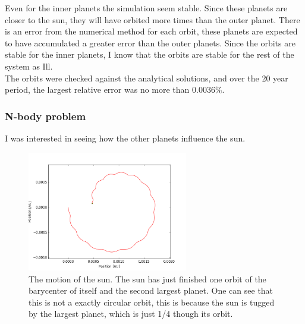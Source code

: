 \documentclass[a4paper, 10pt]{article}
\begin{document}
Even for the inner planets the simulation seem stable. Since these planets are closer to the sun, they will have orbited more times than the outer planet. There is an error from the numerical method for each orbit, these planets are expected to have accumulated a greater error than the outer planets. Since the orbits are stable for the inner planets, I know that the orbits are stable for the rest of the system as Ill.\\

The orbits were checked against the analytical solutions, and over the 20 year period, the largest relative error was no more than $0.0036\%$.


\subsubsection{N-body problem}
I was interested in seeing how the other planets influence the sun.

\begin{figure}[H]
\begin{center}
\includegraphics[width = 70mm]{part2posSun.png}
\caption{The motion of the sun. The sun has just finished one orbit of the barycenter of itself and the second largest planet. One can see that this is not a exactly circular orbit, this is because the sun is tugged by the largest planet, which is just 1/4 though its orbit.}
\end{center}
\end{figure}
\end{document}

